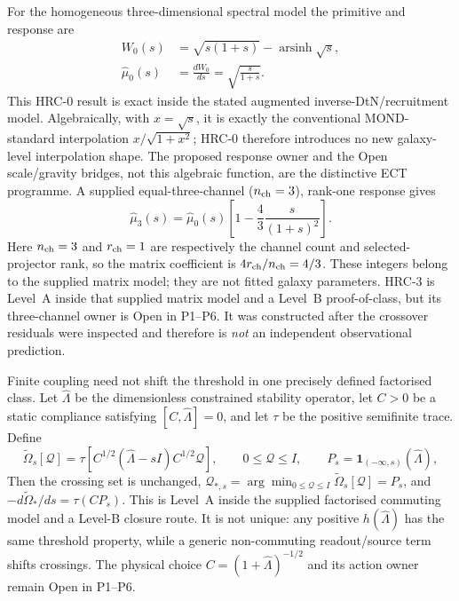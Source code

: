\documentclass[11pt,a4paper]{article}
\begin{document}
For the homogeneous three-dimensional spectral model the primitive and
response are
\begin{align}
 W_0(s)&=\sqrt{s(1+s)}-\operatorname{arsinh}\sqrt{s},\\
 \widehat\mu_0(s)&=\frac{dW_0}{ds}=\sqrt{\frac{s}{1+s}} .
 \label{eq:pop_hrc0}
\end{align}
This HRC-0 result is exact inside the stated augmented
inverse-DtN/recruitment model.  Algebraically, with $x=\sqrt{s}$, it is
exactly the conventional MOND-standard interpolation
$x/\sqrt{1+x^2}$; HRC-0 therefore introduces no new galaxy-level
interpolation shape.  The proposed response owner and the Open scale/gravity
bridges, not this algebraic function, are the distinctive ECT programme.
A supplied equal-three-channel ($n_{\rm ch}=3$), rank-one response gives
\begin{equation}
 \widehat\mu_3(s)=\widehat\mu_0(s)
 \left[1-\frac43\frac{s}{(1+s)^2}\right] .
 \label{eq:pop_hrc3}
\end{equation}
Here $n_{\rm ch}=3$ and $r_{\rm ch}=1$ are respectively the channel count and
selected-projector rank, so the matrix coefficient is
$4r_{\rm ch}/n_{\rm ch}=4/3$.  These integers belong to the supplied matrix
model; they are not fitted galaxy parameters.
HRC-3 is Level~A inside that supplied matrix model and a Level~B
proof-of-class, but its three-channel owner is Open in P1--P6.  It was
constructed after the crossover residuals were inspected and therefore is
\emph{not} an independent observational prediction.

Finite coupling need not shift the threshold in one precisely defined
factorised class.  Let $\widehat\Lambda$ be the dimensionless constrained
stability operator, let $C>0$ be a static compliance satisfying
$[C,\widehat\Lambda]=0$, and let $\tau$ be the positive semifinite trace.
Define
\begin{equation}
 \widetilde\Omega_s[\mathcal Q]=
 \tau\!\left[C^{1/2}(\widehat\Lambda-sI)C^{1/2}\mathcal Q\right],
 \qquad 0\le\mathcal Q\le I,\qquad
 P_s=\mathbf 1_{(-\infty,s)}(\widehat\Lambda),
 \label{eq:pop_hrc_finite_probe}
\end{equation}
Then the crossing set is unchanged,
$\mathcal Q_{*,s}=\arg\min_{0\le\mathcal Q\le I}
\widetilde\Omega_s[\mathcal Q]=P_s$, and
$-d\widetilde\Omega_*/ds=\tau(CP_s)$.  This is Level~A inside the supplied
factorised commuting model and a Level-B closure route.  It is not unique:
any positive $h(\widehat\Lambda)$ has the same threshold property, while a
generic non-commuting readout/source term shifts crossings.  The physical
choice $C=(1+\widehat\Lambda)^{-1/2}$ and its action owner remain Open in
P1--P6.
\end{document}
